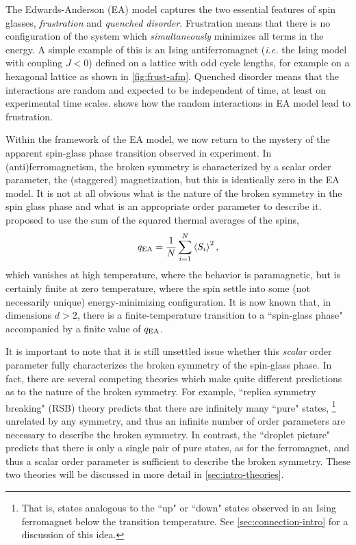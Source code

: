 The Edwards-Anderson (EA) model captures the two essential features of spin
glasses, \emph{frustration} and \emph{quenched disorder}. Frustration means
that there is no configuration of the system which \emph{simultaneously}
minimizes all terms in the energy. A simple example of this is an Ising
antiferromagnet (\textit{i.e.} the Ising model with coupling $J<0$) defined on
a lattice with odd cycle lengths, for example on a hexagonal lattice as shown
in \cref{fig:frust-afm}. Quenched disorder means that the interactions are
random and expected to be independent of time, at least on experimental time
scales.  shows how the random interactions in EA model
lead to frustration.

Within the framework of the EA model, we now return to the mystery of the
apparent spin-glass phase transition observed in experiment. In
(anti)ferromagnetism, the broken symmetry is characterized by a scalar order
parameter, the (staggered) magnetization, but this is identically zero in the
EA model. It is not at all obvious what is the nature of the broken symmetry in
the spin glass phase and what is an appropriate order parameter to describe it.
\textcite{edwards1975theory} proposed to use the sum of the squared thermal
averages of the spins,
\begin{equation}
  q_{\mathrm{EA}} = \frac{1}{N} \sum_{i=1}^N \left< S_i \right>^2,
\end{equation}
which vanishes at high temperature, where the behavior is paramagnetic, but is
certainly finite at zero temperature, where the spin settle into some (not
necessarily unique) energy-minimizing configuration. It is now known that, in
dimensions $d>2$, there is a finite-temperature transition to a ``spin-glass
phase" accompanied by a finite value of $q_{\mathrm{EA}}$.


It is important to note that it is still unsettled issue whether this
\emph{scalar} order parameter fully characterizes the broken symmetry of the
spin-glass phase. In fact, there are several competing theories which make
quite different predictions as to the nature of the broken symmetry. For
example, ``replica symmetry breaking" (RSB) theory predicts that there are
infinitely many ``pure" states,%
\footnote{%
  That is, states analogous to the ``up" or ``down" states observed in an Ising
  ferromagnet below the transition temperature. See \cref{sec:connection-intro}
  for a discussion of this idea.
}
unrelated by any symmetry, and thus an infinite number of order parameters are
necessary to describe the broken symmetry. In contrast, the ``droplet picture"
predicts that there is only a single pair of pure states, as for the
ferromagnet, and thus a scalar order parameter is sufficient to describe the
broken symmetry. These two theories will be discussed in more detail in
\cref{sec:intro-theories}.

